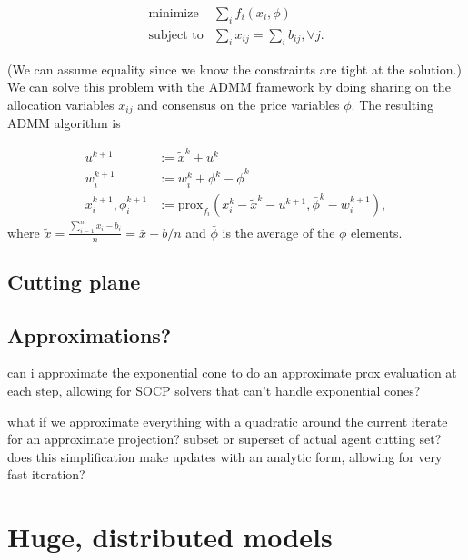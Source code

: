 \documentclass{article}
\begin{document}
\[
\begin{array}{ll}
\mbox{minimize} & \sum_i f_i(x_i, \phi) \\
\mbox{subject to} & \sum_i x_{ij} = \sum_i b_{ij}, \forall j.
\end{array}
\]

(We can assume equality since we know the constraints are tight at the solution.)
We can solve this problem with the ADMM framework by doing sharing on the
allocation variables $x_{ij}$ and consensus on the price variables $\phi$.
The resulting ADMM algorithm is 


\begin{align}
u^{k+1} &:= \tilde{x}^k + u^k \\
w_i^{k+1} &:= w_i^k + \phi^k - \bar{\phi}^k\\
x_i^{k+1}, \phi_i^{k+1} &:= \mbox{prox}_{f_i}(x_i^k - \tilde{x}^k - u^{k+1},
\bar{\phi}^k - w_i^{k+1}),
\end{align}
where $\tilde{x} = \frac{\sum_{i=1}^n x_i - b_i}{n} = \bar{x} - b/n$ and
$\bar{\phi}$ is the average of the $\phi$ elements.



\subsection{Cutting plane}
\subsection{Approximations?}
can i approximate the exponential cone to do an approximate prox evaluation
at each step, allowing for SOCP solvers that can't handle exponential cones?

what if we approximate everything with a quadratic around the current iterate for an approximate projection? subset or superset of actual agent cutting set? does this simplification make updates with an analytic form, allowing for very fast iteration?

\section{Huge, distributed models}

\newpage


\end{document}
